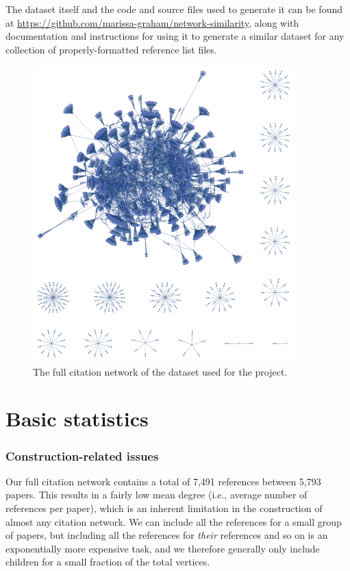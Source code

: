 \documentclass[12pt]{thesis}
\theoremstyle{plain}
\theoremstyle{definition}
\theoremstyle{remark}
\begin{document}
The dataset itself and the code and source files used to generate it can be found at \url{https://github.com/marissa-graham/network-similarity}, along with documentation and instructions for using it to generate a similar dataset for any collection of properly-formatted reference list files.

\begin{figure}[p]
\centering
\includegraphics[width=0.9\textwidth]{full_citation_network.png}
\caption{The full citation network of the dataset used for the project.}
\label{fig:full_database}
\end{figure}








\section{Basic statistics}

\subsubsection{Construction-related issues}

Our full citation network contains a total of 7,491 references between 5,793 papers. This results in a fairly low mean degree (i.e., average number of references per paper), which is an inherent limitation in the construction of almost any citation network. We can include all the references for a small group of papers, but including all the references for \textit{their} references and so on is an exponentially more expensive task, and we therefore generally only include children for a small fraction of the total vertices. 
\end{document}
